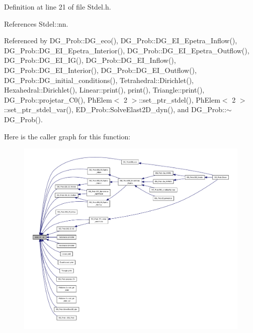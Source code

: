 Definition at line 21 of file Stdel.\+h.



References Stdel\+::nn.



Referenced by D\+G\+\_\+\+Prob\+::\+D\+G\+\_\+eco(), D\+G\+\_\+\+Prob\+::\+D\+G\+\_\+\+E\+I\+\_\+\+Epetra\+\_\+\+Inflow(), D\+G\+\_\+\+Prob\+::\+D\+G\+\_\+\+E\+I\+\_\+\+Epetra\+\_\+\+Interior(), D\+G\+\_\+\+Prob\+::\+D\+G\+\_\+\+E\+I\+\_\+\+Epetra\+\_\+\+Outflow(), D\+G\+\_\+\+Prob\+::\+D\+G\+\_\+\+E\+I\+\_\+\+I\+G(), D\+G\+\_\+\+Prob\+::\+D\+G\+\_\+\+E\+I\+\_\+\+Inflow(), D\+G\+\_\+\+Prob\+::\+D\+G\+\_\+\+E\+I\+\_\+\+Interior(), D\+G\+\_\+\+Prob\+::\+D\+G\+\_\+\+E\+I\+\_\+\+Outflow(), D\+G\+\_\+\+Prob\+::\+D\+G\+\_\+initial\+\_\+conditions(), Tetrahedral\+::\+Dirichlet(), Hexahedral\+::\+Dirichlet(), Linear\+::print(), print(), Triangle\+::print(), D\+G\+\_\+\+Prob\+::projetar\+\_\+\+C0(), Ph\+Elem$<$ 2 $>$\+::set\+\_\+ptr\+\_\+stdel(), Ph\+Elem$<$ 2 $>$\+::set\+\_\+ptr\+\_\+stdel\+\_\+var(), E\+D\+\_\+\+Prob\+::\+Solve\+Elast2\+D\+\_\+dyn(), and D\+G\+\_\+\+Prob\+::$\sim$\+D\+G\+\_\+\+Prob().

Here is the caller graph for this function\+:
\nopagebreak
\begin{figure}[H]
\begin{center}
\leavevmode
\includegraphics[width=350pt]{classStdel_a6086dceed8fe3dd410da0d6b84f02377_icgraph}
\end{center}
\end{figure}
\mbox{\label{classStdel_ae2ab461d1bc8d9f6006665fe03684845}} 
